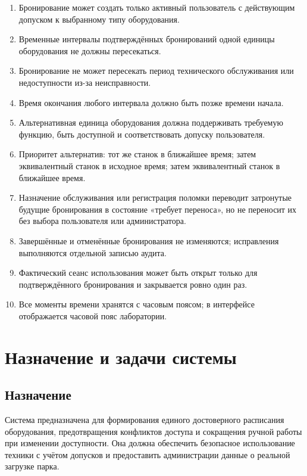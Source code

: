 \documentclass[12pt,a4paper]{article}
\begin{document}
\begin{enumerate}[label=BR-\arabic*.]
    \item Бронирование может создать только активный пользователь с действующим
    допуском к выбранному типу оборудования.
    \item Временные интервалы подтверждённых бронирований одной единицы
    оборудования не должны пересекаться.
    \item Бронирование не может пересекать период технического обслуживания или
    недоступности из-за неисправности.
    \item Время окончания любого интервала должно быть позже времени начала.
    \item Альтернативная единица оборудования должна поддерживать требуемую
    функцию, быть доступной и соответствовать допуску пользователя.
    \item Приоритет альтернатив: тот же станок в ближайшее время; затем
    эквивалентный станок в исходное время; затем эквивалентный станок в ближайшее
    время.
    \item Назначение обслуживания или регистрация поломки переводит затронутые
    будущие бронирования в состояние «требует переноса», но не переносит их без
    выбора пользователя или администратора.
    \item Завершённые и отменённые бронирования не изменяются; исправления
    выполняются отдельной записью аудита.
    \item Фактический сеанс использования может быть открыт только для
    подтверждённого бронирования и закрывается ровно один раз.
    \item Все моменты времени хранятся с часовым поясом; в интерфейсе
    отображается часовой пояс лаборатории.
\end{enumerate}

\section{Назначение и задачи системы}

\subsection{Назначение}

Система предназначена для формирования единого достоверного расписания
оборудования, предотвращения конфликтов доступа и сокращения ручной работы при
изменении доступности. Она должна обеспечить безопасное использование техники
с учётом допусков и предоставить администрации данные о реальной загрузке
парка.
\end{document}
